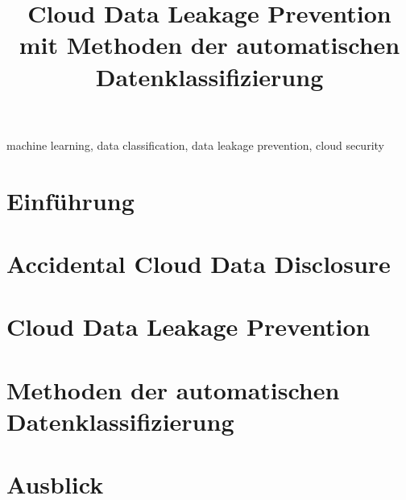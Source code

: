 \documentclass[conference]{IEEEtran}
\begin{document}
\title{Cloud Data Leakage Prevention mit Methoden der automatischen Datenklassifizierung}

\author{
}

\maketitle

\begin{abstract}
    
\end{abstract}

\begin{IEEEkeywords}
    machine learning, data classification, data leakage prevention, cloud security
\end{IEEEkeywords}

\section{Einführung}


\section{Accidental Cloud Data Disclosure} \label{threat-kapitel}


\section{Cloud Data Leakage Prevention} \label{dlp-kapitel}


\section{Methoden der automatischen Datenklassifizierung}


\section{Ausblick}


\balance


\end{document}
